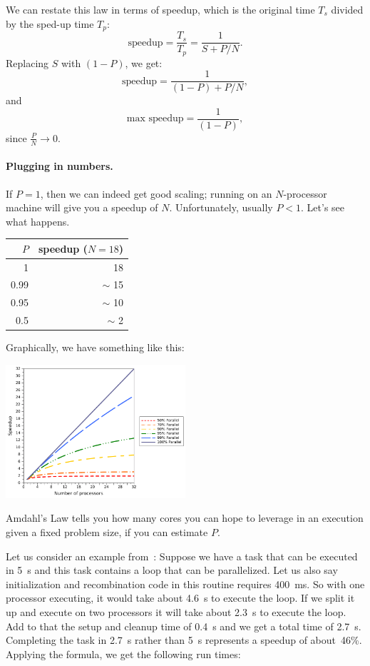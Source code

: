 \documentclass[a4paper]{report}
\begin{document}
We can restate this law in terms of speedup, which is the 
original time $T_s$ divided by the sped-up time $T_p$:
\[ \mbox{speedup} = \frac{T_s}{T_p} = \frac{1}{S+P/N}. \]
Replacing $S$ with $(1-P)$, we get:
\[ \mbox{speedup} = \frac{1}{(1-P)+P/N}, \]
and
\[ \mbox{max speedup} = \frac{1}{(1-P)}, \]
since $\frac{P}{N} \rightarrow 0$.

\paragraph{Plugging in numbers.} If $P = 1$, then we can indeed get good
scaling; running on an $N$-processor machine will give you a speedup
of $N$. Unfortunately, usually $P < 1$.  Let's see what happens.

\begin{center}
\begin{tabular}{r|r}
$P$ & speedup ($N=18$) \\ \hline
1 & 18 \\
0.99 & $\sim$ 15 \\
0.95 & $\sim$ 10 \\
0.5 & $\sim$ 2
\end{tabular}
\end{center}
Graphically, we have something like this:
\begin{center}
  \includegraphics[width=0.5\textwidth]{images/parallel-scaling}
\end{center}


Amdahl's Law tells you how many cores you can hope to leverage in an
execution given a fixed problem size, if you can estimate $P$.

Let us consider an example from~\cite{mte241}: Suppose we have a task that can be executed in 5~s and this task contains a loop that can be parallelized. Let us also say initialization and recombination code in this routine requires 400~ms. So with one processor executing, it would take about 4.6~s to execute the loop. If we split it up and execute on two processors it will take about 2.3~s to execute the loop. Add to that the setup and cleanup time of 0.4~s and we get a total time of 2.7~s. Completing the task in 2.7~s rather than 5~s represents a speedup of about~46\%. Applying the formula, we get the following run times:
\end{document}
